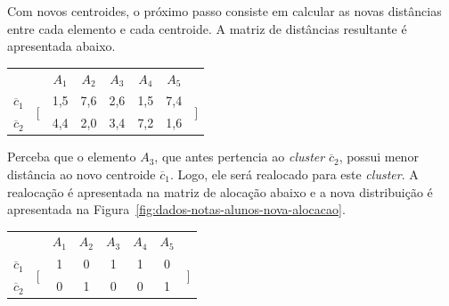 Com novos centroides, o próximo passo consiste em calcular as novas distâncias entre cada elemento e cada centroide. A matriz de distâncias resultante é apresentada abaixo.

\insertspace

\begin{center}
	\begin{tabular}{cccccccc}
		& & $A_1$ & $A_2$ & $A_3$ & $A_4$ & $A_5$ & \\
		$\overline{c}_1$ & \multirow{2}{*}{$\Bigg[$} & 1,5 & 7,6 & 2,6 & 1,5 & 7,4 & \multirow{2}{*}{$\Bigg]$} \\
		\multicolumn{1}{l}{$\overline{c}_2$} & & 4,4 & 2,0 & 3,4 & 7,2 & 1,6 & 
	\end{tabular}
\end{center}

\insertspace

Perceba que o elemento $A_3$, que antes pertencia ao \textit{cluster} $\overline{c}_2$, possui menor distância ao novo centroide $\overline{c}_1$. Logo, ele será realocado para este \textit{cluster}. A realocação é apresentada na matriz de alocação abaixo e a nova distribuição é apresentada na Figura~\ref{fig:dados-notas-alunos-nova-alocacao}.

\insertspace

\begin{center}
	\begin{tabular}{cccccccc}
		& & $A_1$ & $A_2$ & $A_3$ & $A_4$ & $A_5$ & \\
		$\overline{c}_1$ & \multirow{2}{*}{$\Bigg[$} & 1 & 0 & 1 & 1 & 0 & \multirow{2}{*}{$\Bigg]$} \\
		\multicolumn{1}{l}{$\overline{c}_2$} & & 0 & 1 & 0 & 0 & 1 & 
	\end{tabular}
\end{center}

\insertspace

